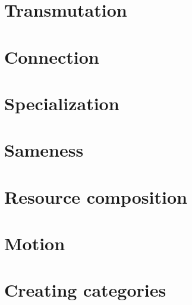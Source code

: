 \documentclass[paper=6in:9in,pagesize=pdftex,
 headinclude=off,footinclude=on,11pt,twoside]{scrbook}
\begin{document}

\setcounter{tocdepth}{1}
\tableofcontents

%

\chapter{Transmutation}

\clearpage

\chapter{Connection}

\clearpage

\chapter{Specialization}

\clearpage
%
\chapter{Sameness}

\clearpage
%
\chapter{Resource composition}

\clearpage
%
\chapter{Motion}

\clearpage
%
\chapter{Creating categories}

\clearpage
%
\end{document}
